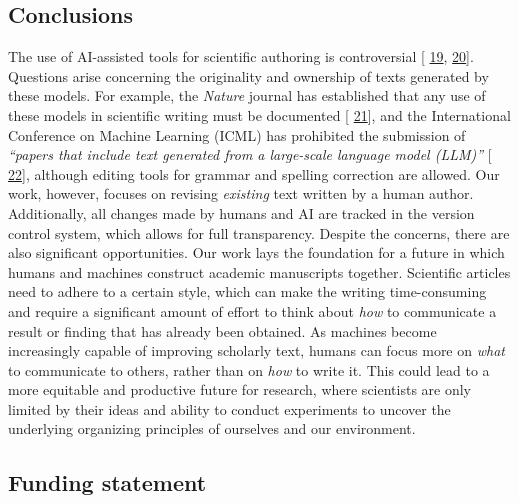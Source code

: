 \documentclass[
]{article}
\providecommand{\DIFaddbegin}{} %
\providecommand{\DIFaddend}{} %
\providecommand{\DIFdelbegin}{} %
\providecommand{\DIFdelend}{} %
\newcommand{\DIFscaledelfig}{0.5}
\newlength{\DIFdelgraphicswidth} %
\newlength{\DIFdelgraphicsheight} %
\newcommand{\DIFaddincludegraphics}[2][]{{\color{blue}\fbox{\DIFOincludegraphics[#1]{#2}}}} %
\newcommand{\DIFdelincludegraphics}[2][]{%
\sbox{\DIFdelgraphicsbox}{\DIFOincludegraphics[#1]{#2}}%
\settoboxwidth{\DIFdelgraphicswidth}{\DIFdelgraphicsbox} %
\settoboxtotalheight{\DIFdelgraphicsheight}{\DIFdelgraphicsbox} %
\scalebox{\DIFscaledelfig}{%
\parbox[b]{\DIFdelgraphicswidth}{\usebox{\DIFdelgraphicsbox}\\[-\baselineskip] \rule{\DIFdelgraphicswidth}{0em}}\llap{\resizebox{\DIFdelgraphicswidth}{\DIFdelgraphicsheight}{%
\setlength{\unitlength}{\DIFdelgraphicswidth}%
\begin{picture}(1,1)%
\thicklines\linethickness{2pt} %
{\color[rgb]{1,0,0}\put(0,0){\framebox(1,1){}}}%
{\color[rgb]{1,0,0}\put(0,0){\line( 1,1){1}}}%
{\color[rgb]{1,0,0}\put(0,1){\line(1,-1){1}}}%
\end{picture}%
}\hspace*{3pt}}} %
} %
\DeclareRobustCommand{\DIFaddbegin}{\DIFOaddbegin \let\includegraphics\DIFaddincludegraphics} %
\DeclareRobustCommand{\DIFaddend}{\DIFOaddend \let\includegraphics\DIFOincludegraphics} %
\DeclareRobustCommand{\DIFdelbegin}{\DIFOdelbegin \let\includegraphics\DIFdelincludegraphics} %
\DeclareRobustCommand{\DIFdelend}{\DIFOaddend \let\includegraphics\DIFOincludegraphics} %
\begin{document}
\subsection{Conclusions}

The use of AI-assisted tools for scientific authoring is controversial {[}\protect\DIFdelbegin %
\DIFdelend \DIFaddbegin \hyperlink{ref-1EAonKBXJ}{19}\DIFaddend ,\protect\DIFdelbegin %
\DIFdelend \DIFaddbegin \hyperlink{ref-KJTJqmxc}{20}{]}\DIFaddend .
Questions arise concerning the originality and ownership of texts generated by these models.
For example, the \emph{Nature} journal has established that any use of these models in scientific writing must be documented {[}\protect\DIFdelbegin %
\DIFdelend \DIFaddbegin \hyperlink{ref-wQLVc4o7}{21}{]}\DIFaddend , and the International Conference on Machine Learning (ICML) has prohibited the submission of \emph{``papers that include text generated from a large-scale language model (LLM)''} {[}\protect\DIFdelbegin %
\DIFdelend \DIFaddbegin \hyperlink{ref-K58CKD6D}{22}{]}\DIFaddend , although editing tools for grammar and spelling correction are allowed.
Our work, however, focuses on revising \emph{existing} text written by a human author.
Additionally, all changes made by humans and AI are tracked in the version control system, which allows for full transparency.
Despite the concerns, there are also significant opportunities.
Our work lays the foundation for a future in which humans and machines construct academic manuscripts together.
Scientific articles need to adhere to a certain style, which can make the writing time-consuming and require a significant amount of effort to think about \emph{how} to communicate a result or finding that has already been obtained.
As machines become increasingly capable of improving scholarly text, humans can focus more on \emph{what} to communicate to others, rather than on \emph{how} to write it.
This could lead to a more equitable and productive future for research, where scientists are only limited by their ideas and ability to conduct experiments to uncover the underlying organizing principles of ourselves and our environment.

\subsection{Funding statement}
\end{document}
